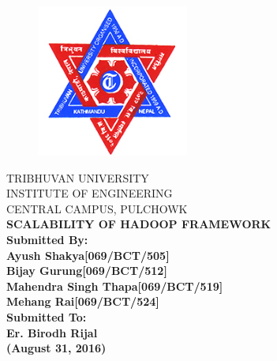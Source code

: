 \newpage
{}
\begin{figure}[t]
        \centering
        \includegraphics[width=50mm]{tu-logo.jpg}
\end{figure}
\begin{nscenter}
        TRIBHUVAN UNIVERSITY\\ 
        INSTITUTE OF ENGINEERING\\
        CENTRAL CAMPUS, PULCHOWK\\
        \vspace{21mm}
        \bfseries{
                SCALABILITY OF HADOOP FRAMEWORK\\
        }
        \vspace{18mm}
        \textbf {Submitted By:}\\
        \textnormal{
                Ayush Shakya\hspace{25mm}[069/BCT/505]\\
                Bijay Gurung\hspace{25mm}[069/BCT/512]\\
                Mahendra Singh Thapa\hspace{9mm}[069/BCT/519]\\
                Mehang Rai\hspace{28mm}[069/BCT/524]\\
        } 
        \vspace{18mm}
        \textbf{Submitted To:}\\
        \textnormal{
                Er. Birodh Rijal\\
        }
        \vspace{24mm}
                (August 31, 2016)
\end{nscenter}
